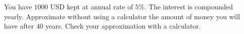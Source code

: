 \begin{frame}
\begin{example}
You have $1000$ USD kept at annual rate of $5$\%. The interest is compounded yearly. Approximate without using a calculator the amount of money you will have after $40$ years. Check your approximation with a calculator.

\end{example}

\end{frame}